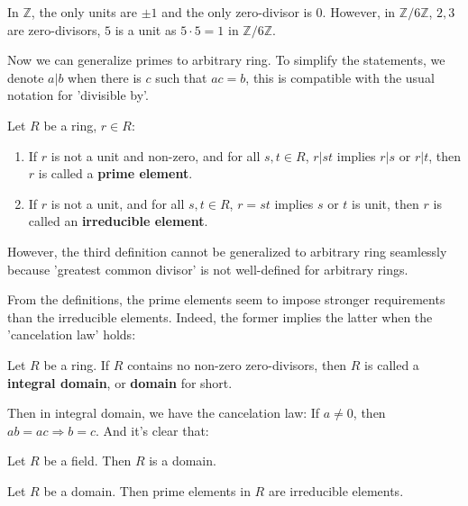 \documentclass{note-eng}
\begin{document}
\begin{example}
    In $\mathbb{Z}$, the only units are $\pm 1$ and the only zero-divisor is $0$. However, in $\mathbb{Z} / 6\mathbb{Z}$, $2, 3$ are zero-divisors, $5$ is a unit as $5 \cdot 5 = 1$ in $\mathbb{Z} / 6 \mathbb{Z}$.
\end{example}

Now we can generalize primes to arbitrary ring. To simplify the statements, we denote $a | b$ when there is $c$ such that $ac = b$, this is compatible with the usual notation for 'divisible by'.

\begin{definition}
    Let $R$ be a ring, $r \in R$:
    \begin{enumerate}
        \item If $r$ is not a unit and non-zero, and for all $s, t \in R$, $r | st$ implies $r | s$ or $r | t$, then $r$ is called a \textbf{prime element}.
        \item If $r$ is not a unit, and for all $s, t \in R$, $r = st$ implies $s$ or $t$ is unit, then $r$ is called an \textbf{irreducible element}.
    \end{enumerate}
\end{definition}

However, the third definition cannot be generalized to arbitrary ring seamlessly because 'greatest common divisor' is not well-defined for arbitrary rings.

From the definitions, the prime elements seem to impose stronger requirements than the irreducible elements. Indeed, the former implies the latter when the 'cancelation law' holds:

\begin{definition}
    Let $R$ be a ring. If $R$ contains no non-zero zero-divisors, then $R$ is called a \textbf{integral domain}, or \textbf{domain} for short.
\end{definition}

Then in integral domain, we have the cancelation law: If $a \ne 0$, then $ab = ac \Rightarrow b = c$. And it's clear that:

\begin{proposition}
    Let $R$ be a field. Then $R$ is a domain.
\end{proposition}

\begin{proposition}\label{prop:prime-is-irreducible-domain}
    Let $R$ be a domain. Then prime elements in $R$ are irreducible elements.
\end{proposition}
\end{document}
